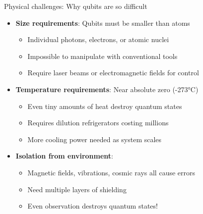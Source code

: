 \documentclass[aspectratio=169, lualatex, handout]{beamer}
\begin{document}
\begin{frame}{Physical challenges: Why qubits are so difficult}
	\begin{itemize}
		\item \textbf{Size requirements}: Qubits must be smaller than atoms
		      \begin{itemize}
			      \item Individual photons, electrons, or atomic nuclei
			      \item Impossible to manipulate with conventional tools
			      \item Require laser beams or electromagnetic fields for control
		      \end{itemize}
		\item \textbf{Temperature requirements}: Near absolute zero (-273°C)
		      \begin{itemize}
			      \item Even tiny amounts of heat destroy quantum states
			      \item Requires dilution refrigerators costing millions
			      \item More cooling power needed as system scales
		      \end{itemize}
		\item \textbf{Isolation from environment}:
		      \begin{itemize}
			      \item Magnetic fields, vibrations, cosmic rays all cause errors
			      \item Need multiple layers of shielding
			      \item Even observation destroys quantum states!
		      \end{itemize}
	\end{itemize}
\end{frame}
\end{document}

